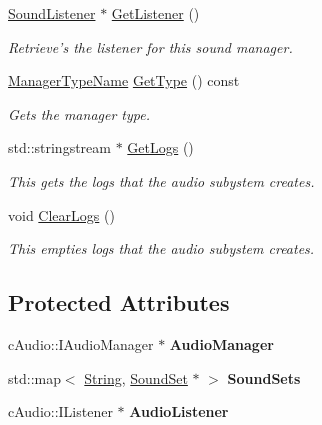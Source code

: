 \begin{DoxyCompactItemize}
\hyperlink{classphys_1_1SoundListener}{SoundListener} $\ast$ \hyperlink{classphys_1_1SoundManager_af0c700e283c44c20466185e1150fc6a3}{GetListener} ()
\begin{DoxyCompactList}\small\item\em Retrieve's the listener for this sound manager. \item\end{DoxyCompactList}\item 
\hyperlink{classphys_1_1ManagerBase_aaa6ccddf23892eaccb898529414f80a5}{ManagerTypeName} \hyperlink{classphys_1_1SoundManager_a6815f78a6170b119e2d1d24e862ffbf8}{GetType} () const 
\begin{DoxyCompactList}\small\item\em Gets the manager type. \item\end{DoxyCompactList}\item 
std::stringstream $\ast$ \hyperlink{classphys_1_1SoundManager_a284fbc2fdbecdf66e717366b09e2c9da}{GetLogs} ()
\begin{DoxyCompactList}\small\item\em This gets the logs that the audio subystem creates. \item\end{DoxyCompactList}\item 
void \hyperlink{classphys_1_1SoundManager_acc3551bcda7b1c681d83d81cc25747ae}{ClearLogs} ()
\begin{DoxyCompactList}\small\item\em This empties logs that the audio subystem creates. \item\end{DoxyCompactList}\end{DoxyCompactItemize}
\subsection*{Protected Attributes}
\begin{DoxyCompactItemize}
\item 
\hypertarget{classphys_1_1SoundManager_a16bf0c35e031e2359d27c6b12536c98d}{
cAudio::IAudioManager $\ast$ {\bfseries AudioManager}}
\label{d1/dc4/classphys_1_1SoundManager_a16bf0c35e031e2359d27c6b12536c98d}

\item 
\hypertarget{classphys_1_1SoundManager_a7a8e89ec9886d28cf6331930b4269fb3}{
std::map$<$ \hyperlink{namespacephys_aa03900411993de7fbfec4789bc1d392e}{String}, \hyperlink{namespacephys_ab780c3162da5699fe421f3739ba03fc4}{SoundSet} $\ast$ $>$ {\bfseries SoundSets}}
\label{d1/dc4/classphys_1_1SoundManager_a7a8e89ec9886d28cf6331930b4269fb3}

\item 
\hypertarget{classphys_1_1SoundManager_a5b882ae37b8fbe843eee1f865be72a51}{
cAudio::IListener $\ast$ {\bfseries AudioListener}}
\label{d1/dc4/classphys_1_1SoundManager_a5b882ae37b8fbe843eee1f865be72a51}

\end{DoxyCompactItemize}


